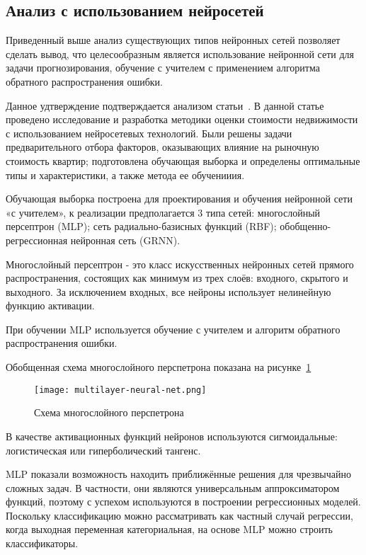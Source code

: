 \subsection{Анализ с использованием нейросетей}
\label{sec:analogues:neural}

Приведенный выше анализ существующих типов нейронных сетей позволяет сделать вывод, что целесообразным является
использование нейронной сети для задачи прогнозирования, обучение с учителем с применением алгоритма обратного
распространения ошибки.

Данное удтверждение подтверждается анализом статьи~\cite{using_neural_engines}. В данной статье проведено
исследование и разработка методики оценки стоимости \linebreak недвижимости с использованием нейросетевых технологий. Были решены
задачи предварительного отбора факторов, оказывающих влияние на рыночную стоимость квартир; подготовлена обучающая выборка
и определены оптимальные типы и характеристики, а также метода ее обученииия.

Обучающая выборка построена для проектирования и обучения нейронной сети «с учителем», к реализации
предполагается 3 типа сетей: многослойный персептрон (MLP); сеть радиально-базисных функций (RBF);\linebreak
обобщенно-регрессионная нейронная сеть (GRNN).

Многослойный персептрон - это класс искусственных нейронных сетей прямого распространения, состоящих как минимум из
трех слоёв: входного, скрытого и выходного. За исключением входных, все нейроны использует нелинейную функцию активации.

При обучении MLP используется обучение с учителем и алгоритм обратного распространения ошибки.

Обобщенная схема многослойного перспетрона показана на \linebreak рисунке~\ref{fig:analogues:multilayer-neural-net}

\begin{figure}[!ht]
  \centering
  \texttt{[image: multilayer-neural-net.png]} 
  \caption{Схема многослойного перспетрона}
  \label{fig:analogues:multilayer-neural-net}
\end{figure}

В качестве активационных функций нейронов используются сигмоидальные: логистическая или гиперболический тангенс.

MLP показали возможность находить приближённые решения для чрезвычайно сложных задач. В частности, они являются
универсальным аппроксиматором функций, поэтому с успехом используются в построении регрессионных моделей.
Поскольку классификацию можно рассматривать как частный случай регрессии, когда выходная переменная категориальная,
на основе MLP можно строить классификаторы.

